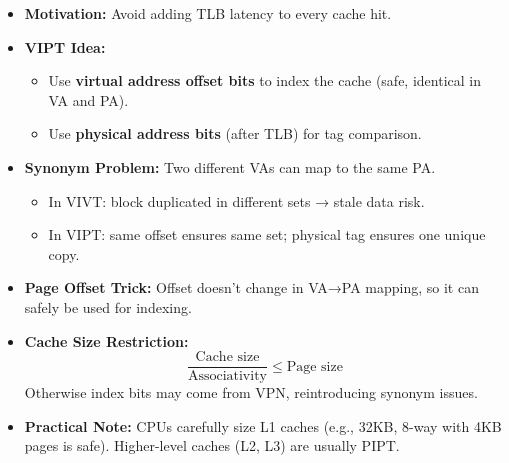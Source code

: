 \highspace
\begin{takeawaysbox}
    \begin{itemize}
    \item \textbf{Motivation:} Avoid adding TLB latency to every cache hit.
    \item \textbf{VIPT Idea:} 
        \begin{itemize}
        \item Use \textbf{virtual address offset bits} to index the cache (safe, identical in VA and PA).
        \item Use \textbf{physical address bits} (after TLB) for tag comparison.
        \end{itemize}
    \item \textbf{Synonym Problem:} Two different VAs can map to the same PA. 
        \begin{itemize}
        \item In VIVT: block duplicated in different sets → stale data risk.
        \item In VIPT: same offset ensures same set; physical tag ensures one unique copy.
        \end{itemize}
    \item \textbf{Page Offset Trick:} Offset doesn’t change in VA→PA mapping, so it can safely be used for indexing.
    \item \textbf{Cache Size Restriction:} 
        \[
        \frac{\text{Cache size}}{\text{Associativity}} \leq \text{Page size}
        \]
        Otherwise index bits may come from VPN, reintroducing synonym issues.
    \item \textbf{Practical Note:} CPUs carefully size L1 caches (e.g., 32KB, 8-way with 4KB pages is safe). 
            Higher-level caches (L2, L3) are usually PIPT.
    \end{itemize}
\end{takeawaysbox}